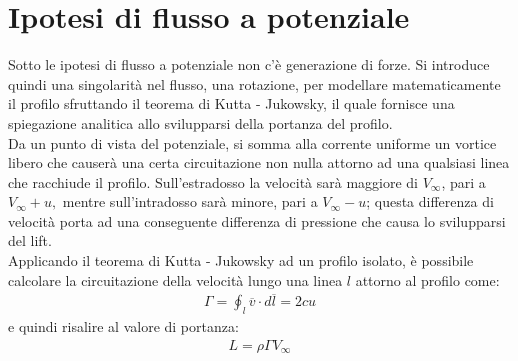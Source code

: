 \section{Ipotesi di flusso a potenziale}
Sotto le ipotesi di flusso a potenziale non c'è generazione di forze. Si introduce quindi una singolarità nel flusso, una rotazione, per modellare matematicamente il profilo sfruttando il teorema di Kutta - Jukowsky, il quale fornisce una spiegazione analitica allo svilupparsi della portanza del profilo.\\
Da un punto di vista del potenziale, si somma alla corrente uniforme un vortice libero che causerà una certa circuitazione non nulla attorno ad una qualsiasi linea che racchiude il profilo. Sull'estradosso la velocità sarà maggiore di $V_{\infty}$, pari a $V_{\infty}+u,$ mentre sull'intradosso sarà minore, pari a $V_{\infty}-u$; questa differenza di velocità porta ad una conseguente differenza di pressione che causa lo svilupparsi del lift.\\
Applicando il teorema di Kutta - Jukowsky ad un profilo isolato, è possibile calcolare la circuitazione della velocità lungo una linea $l$ attorno al profilo come:
\begin{align*}
\Gamma = \oint_l \overline{v} \cdot d \overline{l} = 2cu
\end{align*}
e quindi risalire al valore di portanza:
\begin{align*}
L=\rho \Gamma V_\infty
\end{align*}

